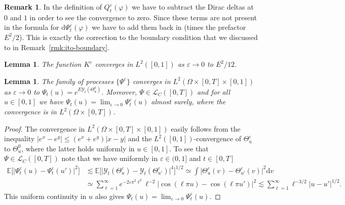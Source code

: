 \documentclass[10pt]{amsart}
\newtheorem{lemm}[theo]{Lemma}\newtheorem{prop}[theo]{Proposition}\newtheorem{coro}[theo]{Corollary}\newtheorem{conj}[theo]{Conjecture}
\theoremstyle{definition}\newtheorem{defi}[theo]{Definition}\newtheorem{rema}[theo]{Remark}\newtheorem{exam}[theo]{Example}\newtheorem{exem}[theo]{Example}\newtheorem{nota}[theo]{Notation}
\newcommand{\bb}[1]{{\mathbb #1}}
\newcommand{\mc}[1]{{\mathcal #1}}
\renewcommand{\mc}[1]{{\mathcal #1}}
\renewcommand{\le}{\leqslant}
\newcommand*{\dd}{\mathrm{d}}
\newcommand*{\dv}{\dd v}
\begin{document}
\begin{rema}\label{rmk:boundary-correction-from-Q}
In the definition of $Q^\varepsilon_t(\varphi)$ we have to subtract the Dirac deltas at $0$ and $1$ in order to see the convergence to zero. Since these terms are not present in the formula for $\dd \Psi^\varepsilon_t(\varphi)$ we have to add them back in (times the prefactor $E^2/2$). This is exactly the correction to the boundary condition that we discussed to in Remark~\ref{rmk:ito-boundary}.
\end{rema}

\begin{lemm}\label{lem:constant-conv}
The function $K^{\varepsilon}$ converges in $L^2 ([0, 1])$ as $\varepsilon \rightarrow 0$ to $E^2 / 12$.
\end{lemm}

\begin{lemm}
The family of processes $\{\Psi^{\varepsilon}\}$ converges in $L^2(\Omega \times [0,T] \times [0,1])$ as $ \varepsilon \to 0$ to $\Psi_t (u) = e^{E \mc Y_t (\Theta^0_u)}$. Moreover, $\Psi \in \mc L_C([0,T])$ and for all $u \in [0,1]$ we have $\Psi_t(u) = \lim_{\varepsilon \to 0} \Psi^\varepsilon_t(u)$ almost surely, where the convergence is in $L^2(\Omega \times [0,T])$.
\end{lemm}

\begin{proof}
The convergence in $L^2(\Omega \times [0,T] \times [0,1])$ easily follows from the inequality $|e^x - e^y| \le (e^x + e^y) |x-y|$ and the $L^2([0,1])$-convergence of $\Theta^\varepsilon_u$ to $\Theta^0_u$, where the latter holds uniformly in $u \in [0,1]$. To see that $\Psi \in \mc L_C([0,T])$ note that we have uniformly in $\varepsilon \in (0,1]$ and $t \in [0,T]$
\begin{align*}
\bb E\Big[\big|\Psi^\varepsilon_t(u) - \Psi^\varepsilon_t(u')\big|^2\Big] & \lesssim \bb E\Big[\big|\mc Y_t (\Theta^\varepsilon_u) - \mc Y_t (\Theta^\varepsilon_{u'})\big|^4\Big]^{1/2} \simeq \int \big|\Theta^\varepsilon_u(v) - \Theta^\varepsilon_{u'}(v)\big|^2 \dv \\
& \simeq \sum_{\ell = 1}^\infty e^{-2\varepsilon \pi^2 \ell^2} \ell^{-2} |\cos(\ell \pi u) - \cos(\ell \pi u')|^2 \lesssim \sum_{\ell = 1}^\infty \ell^{-3/2} |u - u'|^{1/2}.
\end{align*}
This uniform continuity in $u$ also gives $\Psi_t(u) = \lim_{\varepsilon \to 0} \Psi^\varepsilon_t(u)$.
\end{proof}
\end{document}
